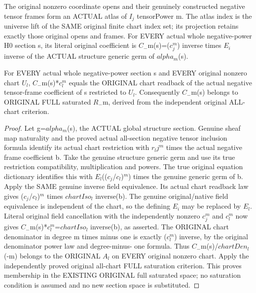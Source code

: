 \begin{definition}
\label{def:seven-native-negative-tensor-atlas-coefficient}
\leanok
The original nonzero coordinate opens and their genuinely constructed
negative tensor frames form an ACTUAL atlas of $I_j$ tensorPower m.
The atlas index is the universe lift of the SAME original finite chart
index set; its projection retains exactly those original opens and frames.
For EVERY actual whole negative-power H0 section s, its literal original
coefficient is $C_-$m(s)=($c_j^m$) inverse times $E_i$ inverse of the ACTUAL
structure generic germ of $alpha_m$(s).
\end{definition}

\begin{theorem}
\label{thm:seven-native-negative-tensor-original-full-coefficient}
\leanok
For EVERY actual whole negative-power section s and EVERY original
nonzero chart $U_l$, $C_-$m(s)*$c_l^m$ equals the ORIGINAL chart readback of
the actual negative tensor-frame coefficient of s restricted to $U_l$.
Consequently $C_-$m(s) belongs to ORIGINAL FULL saturated $R_-$m, derived
from the independent original ALL-chart criterion.
\end{theorem}
\begin{proof}
Let g=$alpha_m$(s), the ACTUAL global structure section. Genuine sheaf
map naturality and the proved actual all-section negative tensor
inclusion formula identify its actual chart restriction with $r_l$$j^m$
times the actual negative frame coefficient b. Take the genuine
structure generic germ and use its true restriction compatibility,
multiplication and powers. The true original equation dictionary
identifies this with $E_l$(($c_j$/$c_l$)$^m$) times the genuine generic germ
of b. Apply the SAME genuine inverse field equivalence. Its actual
chart readback law gives ($c_j$/$c_l$)$^m$ times $chartIso_l$ inverse(b).
The genuine original/native field equivalence is independent of the
chart, so the defining $E_i$ may be replaced by $E_l$. Literal original
field cancellation with the independently nonzero $c_j^m$ and $c_l^m$
now gives $C_-$m(s)*$c_l^m$=$chartIso_l$ inverse(b), as asserted.
The ORIGINAL chart denominator in degree m times minus one is exactly
($c_l^m$) inverse, by the original denominator power law and degree-minus-
one formula. Thus $C_-$m(s)/$chartDen_l$(-m) belongs to the ORIGINAL $A_l$
on EVERY original nonzero chart. Apply the independently proved original
all-chart FULL saturation criterion. This proves membership in the
EXISTING ORIGINAL full saturated space; no saturation condition is
assumed and no new section space is substituted.
\end{proof}

